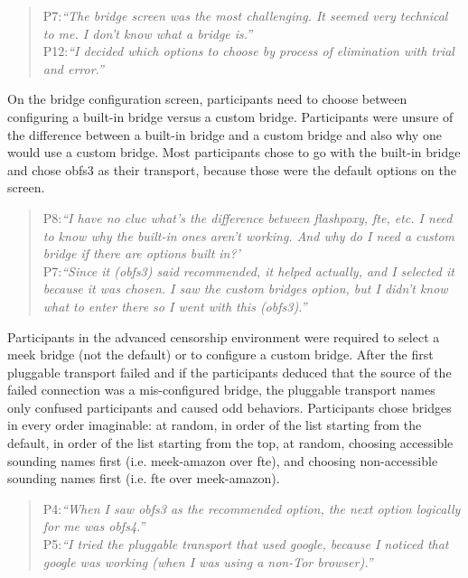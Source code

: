 \documentclass{template}
\begin{document}
\begin{quotation}
\noindent P7:\textit{``The bridge screen was the most challenging. It seemed very technical to me. I don't know what a bridge is.''}\\

\noindent P12:\textit{``I decided which options to choose by process of elimination with trial and error.''}
\end{quotation} 

On the bridge configuration screen, participants need to choose between configuring a built-in bridge versus a custom bridge. Participants were unsure of the difference between a built-in bridge and a custom bridge and also why one would use a custom bridge. Most participants chose to go with the built-in bridge and chose obfs3 as their transport, because those were the default options on the screen. 

\begin{quotation} 
\noindent P8:\textit{``I have no clue what's the difference between flashpoxy, fte, etc. I need to know why the built-in ones aren't working. And why do I need a custom bridge if there are options built in?'}\\

\noindent P7:\textit{``Since it (obfs3) said recommended, it helped actually, and I selected it because it was chosen. I saw the custom bridges option, but I didn't know what to enter there so I went with this (obfs3).''}
\end{quotation} 

Participants in the advanced censorship environment were required to select a meek bridge (not the default) or to configure a custom bridge. After the first pluggable transport failed and if the participants deduced that the source of the failed connection was a mis-configured bridge, the pluggable transport names only confused participants and caused odd behaviors. Participants chose bridges in every order imaginable: at random, in order of the list starting from the default, in order of the list starting from the top, at random, choosing accessible sounding names first (i.e. meek-amazon over fte), and choosing non-accessible sounding names first (i.e. fte over meek-amazon). 

\begin{quotation}
\noindent P4:\textit{``When I saw obfs3 as the recommended option, the next option logically for me was obfs4.''}\\

\noindent P5:\textit{``I tried the pluggable transport that used google, because I noticed that google was working (when I was using a non-Tor browser).''}
\end{quotation} 
\end{document}
